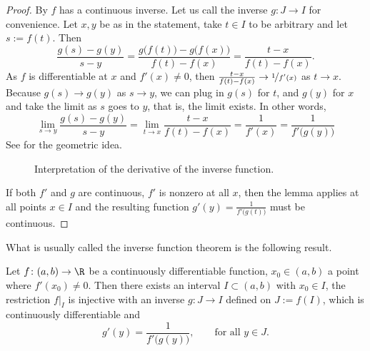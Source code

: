\documentclass[12pt]{book}
\begin{document}
\begin{proof}
By  $f$ has a continuous inverse.
Let us
call the inverse $g \colon J \to I$ for convenience.
Let $x,y$ be as in the statement, take $t \in I$ to be arbitrary
and let $s := f(t)$.
Then
\begin{equation*}
\frac{g(s)-g(y)}{s-y} =
\frac{g\bigl(f(t)\bigr)-g\bigl(f(x)\bigr)}{f(t)-f(x)} =
\frac{t-x}{f(t)-f(x)} .
\end{equation*}
As $f$ is differentiable at $x$ and $f'(x) \not= 0$, then 
$\frac{t-x}{f(t)-f(x)} \to \nicefrac{1}{f'(x)}$ as $t \to x$.
Because $g(s) \to g(y)$ as $s \to y$, we 
can plug in $g(s)$ for $t$, and $g(y)$ for $x$ and take the limit
as $s$ goes to $y$, that is, the limit exists.
In other words,
\begin{equation*}
\lim_{s \to y}
\frac{g(s)-g(y)}{s-y} 
=
\lim_{t \to x} \frac{t-x}{f(t)-f(x)} 
=
\frac{1}{f'(x)} 
=
\frac{1}{f'\bigl(g(y)\bigr)}
\end{equation*}
See  for the geometric idea.
\begin{figure}[h!t]
\begin{center}

\quad

\caption{Interpretation of the derivative of the inverse
function.\label{inversefig}}
\end{center}
\end{figure}

If both $f'$ and $g$ are continuous, $f'$ is nonzero at all $x$,
then the lemma applies at all points $x \in I$ and the resulting function $g'(y) =
\frac{1}{f'\bigl(g(t)\bigr)}$ must be continuous.
\end{proof}

What is usually called the inverse function theorem is the following result.

\begin{thm}
Let $f \colon (a,b) \to \R$ be a continuously differentiable function,
$x_0 \in (a,b)$ a point where $f'(x_0) \not= 0$.
Then there exists
an interval $I \subset (a,b)$ with $x_0 \in I$, the
restriction $f|_{I}$ is injective with an inverse
$g \colon J \to I$ defined on $J := f(I)$,
which is continuously differentiable and
\begin{equation*}
g'(y) = \frac{1}{f'\bigl( g(y) \bigr)} , \qquad \text{for all $y \in J$}.
\end{equation*}
\end{thm}
\end{document}
